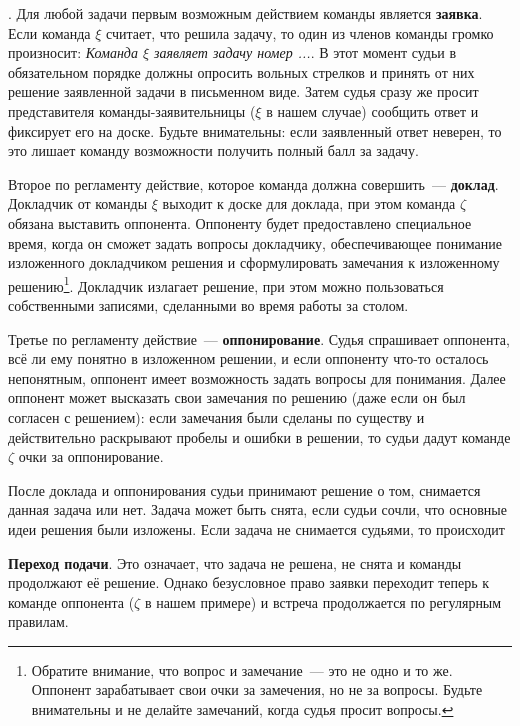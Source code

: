 \documentclass[12pt]{article}
\begin{document}
. Для любой задачи первым возможным действием команды является {\bf заявка}. Если команда $\xi$ считает, что решила задачу, то один из членов команды громко произносит: \textsl{Команда $\xi$ заявляет задачу номер ...}. В этот момент судьи в обязательном порядке должны опросить вольных стрелков и принять от них решение заявленной задачи в письменном виде. Затем судья сразу же просит представителя команды-заявительницы ($\xi$ в нашем случае) сообщить ответ и фиксирует его на доске. Будьте внимательны: если заявленный ответ неверен, то это лишает команду возможности получить полный балл за задачу.

Второе по регламенту действие, которое команда должна совершить~--- {\bf доклад}. Докладчик от команды $\xi$ выходит к доске для доклада, при этом команда $\zeta$ обязана выставить оппонента. Оппоненту будет предоставлено специальное время, когда он сможет задать вопросы докладчику, обеспечивающее понимание изложенного докладчиком решения и сформулировать замечания к изложенному решению\footnote{Обратите внимание, что вопрос и замечание~--- это не одно и то же. Оппонент зарабатывает свои очки за замечения, но не за вопросы. Будьте внимательны и не делайте замечаний, когда судья просит вопросы.}. Докладчик излагает решение, при этом можно пользоваться собственными записями, сделанными во время работы за столом.

Третье по регламенту действие~--- \textbf{оппонирование}. Судья спрашивает оппонента, всё ли ему понятно в изложенном решении, и если оппоненту что-то осталось непонятным, оппонент имеет возможность задать вопросы для понимания. Далее оппонент может высказать свои замечания по решению (даже если он был согласен с решением): если замечания были сделаны по существу и действительно раскрывают пробелы и ошибки в решении, то судьи дадут команде $\zeta$ очки за оппонирование.

После доклада и оппонирования судьи принимают решение о том, снимается данная задача или нет. Задача может быть снята, если судьи сочли, что основные идеи решения были изложены. Если задача не снимается судьями, то происходит

\noindent\textbf{Переход подачи}. Это означает, что задача не решена, не снята и команды продолжают её решение. Однако безусловное право заявки переходит теперь к команде оппонента ($\zeta$ в нашем примере) и встреча продолжается по регулярным правилам.
\end{document}
